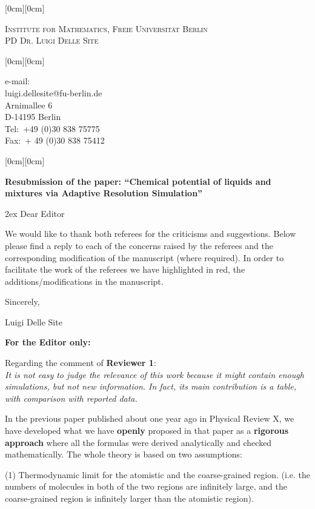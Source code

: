 \documentclass[12pt]{article}
\newcommand{\kopf}{\noindent
\raisebox{2.5cm}[0cm][0cm]
{
\parbox[c]{0.88\textwidth}
{
\begin{center}
\textsc{\large Institute for Mathematics, Freie Universit\"{a}t Berlin}\\
\textsc{ PD Dr. Luigi Delle Site}
\end{center}
}
}}
\begin{document}
\kopf
\vspace{2cm}
\hfill\raisebox{1.5cm}[0cm][0cm]
{\parbox[t]{0.34\textwidth}
{e-mail:\\
{\small luigi.dellesite@fu-berlin.de}\\
Arnimallee 6\\
D-14195 Berlin\\
Tel:\ +49 (0)30 838 75775 \\
Fax:\ + 49 (0)30 838 75412 \\
}}
\vspace{3cm}
\noindent\raisebox{1.5cm}[0cm][0cm]
{}
\vspace{1cm}

\textbf{Resubmission of the paper: ``Chemical potential of liquids and mixtures via Adaptive Resolution Simulation''}

\vspace{1cm}
\parskip 2ex
Dear Editor

We would like to thank both referees for the criticisms and suggestions.
Below please find a reply to each of the concerns raised by the referees and the
corresponding modification of the manuscript (where required).
In order to facilitate the work of the referees we have highlighted in red, the additions/modifications in the manuscript.

\vskip 1cm
Sincerely,

Luigi Delle Site

\newpage

{\bf For the Editor only:}


Regarding the comment of {\bf Reviewer 1}:\\
{\color{blue} \it  It is not easy to judge the relevance of this
  work because it might contain enough simulations, but not new information. In fact, its main contribution is a table, with comparison with reported data.}

In the previous paper published about one year ago in Physical Review X,
we have developed what we have {\bf openly} proposed in that paper as a {\bf rigorous approach} where all the formulas were derived analytically and checked mathematically.
The whole theory is based on two assumptions:

(1) Thermodynamic limit for the {atomistic and the coarse-grained region. (i.e. the numbers of molecules in both of the two
  regions are infinitely large, and the coarse-grained region is infinitely larger than the atomistic region)}.
\end{document}
